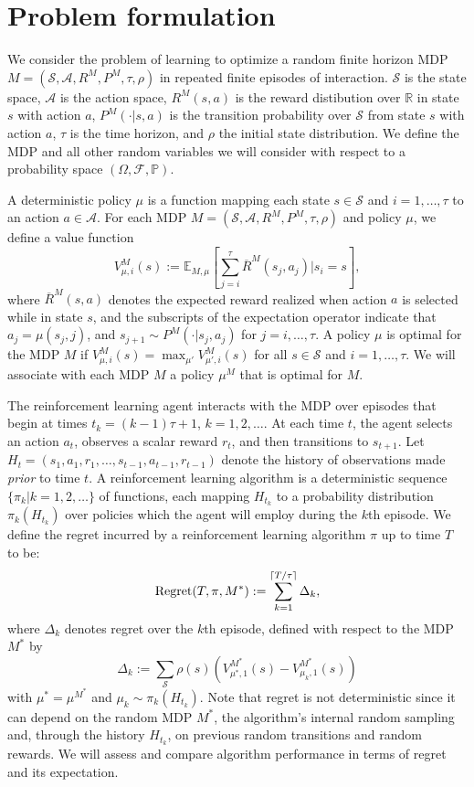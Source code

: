 \documentclass{article}
\newcommand{\Exp}{\mathds{E}}
\newcommand{\Real}{\mathds{R}}
\newcommand{\Sc}{\mathcal{S}}
\newcommand{\Ac}{\mathcal{A}}
\begin{document}
\section{Problem formulation}

We consider the problem of learning to optimize a random finite horizon MDP $M = (\Sc, \Ac, R^M, P^M, \tau, \rho)$ in repeated finite episodes of interaction. 
$\mathcal{S}$ is the state space, $\mathcal{A}$ is the action space, $R^M(s,a)$ is the reward distibution over $\Real$ in state $s$ with action $a$, $P^M(\cdot|s,a)$ is the transition probability over $\Sc$ from state $s$ with action $a$, $\tau$ is the time horizon, and $\rho$ the initial state distribution.  
We define the MDP and all other random variables we will consider with respect to a probability space $(\Omega, \mathcal{F}, \mathbb{P})$.

A deterministic policy $\mu$ is a function mapping each state $s \in \Sc$ and $i = 1,\ldots,\tau$ to an action $a \in \Ac$.
For each MDP $M = (\mathcal{S}, \mathcal{A}, R^M, P^M, \tau, \rho)$ and policy $\mu$, we define a value function
$$V^{M}_{\mu, i}(s) := \Exp_{M,\mu}\left[ \sum_{j=i}^{\tau} \overline{R}^M(s_j,a_j) \Big| s_i = s \right],$$
where $\overline{R}^M(s,a)$ denotes the expected reward realized when action $a$ is selected while in state $s$, and the subscripts of the expectation operator indicate that $a_j = \mu(s_j, j)$, and $s_{j+1} \sim P^M(\cdot| s_j, a_j)$ for $j = i, \ldots, \tau$.
A policy $\mu$ is optimal for the MDP $M$ if $V^{M}_{\mu, i}(s) = \max_{\mu'} V^{M}_{\mu', i}(s)$ for all $s \in \Sc$ and $i=1,\ldots,\tau$. We will associate with each MDP $M$ a policy $\mu^M$ that is optimal for $M$. 

The reinforcement learning agent interacts with the MDP over episodes that begin at times $t_k = (k-1) \tau + 1$, $k=1,2,\ldots$.
At each time $t$, the agent selects an action $a_t$, observes a scalar reward $r_t$, and then transitions to $s_{t+1}$.
Let $H_t = (s_1,a_1,r_1,\ldots,s_{t-1},a_{t-1},r_{t-1})$ denote the history of observations made \emph{prior} to time $t$.  
A reinforcement learning algorithm is a deterministic sequence $\{\pi_k | k = 1, 2, \ldots\}$ of functions, each mapping $H_{t_k}$ to a probability distribution $\pi_{k}(H_{t_k})$ over policies which the agent will employ during the $k$th episode.
We define the regret incurred by a reinforcement learning algorithm $\pi$ up to time $T$ to be:
$${\rm Regret}(T, \pi, M^*) := \sum_{k=1}^{\lceil T/\tau \rceil} \Delta_k,$$
where $\Delta_k$ denotes regret over the $k$th episode, defined with respect to the MDP $M^*$ by
$$\Delta_k := \sum_{\Sc} \rho(s) (V^{M^*}_{\mu^*, 1}(s) - V^{M^{*}}_{\mu_k, 1}(s))$$
with $\mu^* = \mu^{M^*}$ and $\mu_{k}\sim \pi_{k}(H_{t_k})$. Note that regret is not deterministic since it can depend on the random MDP $M^*$, the algorithm's internal random sampling and, through the history $H_{t_k}$, on previous random transitions and random rewards. We will assess and compare algorithm performance in terms of regret and its expectation.
\end{document}
